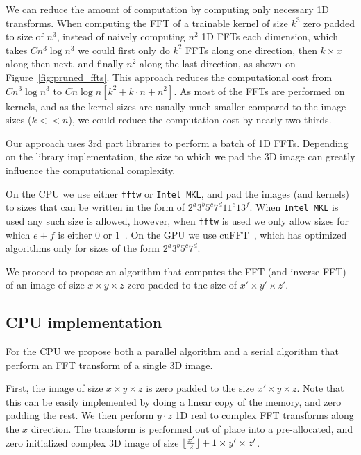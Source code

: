 \documentclass[conference]{IEEEtran}
\DeclarePairedDelimiter{\floor}{\lfloor}{\rfloor}
\begin{document}
  We can reduce the amount of computation by computing only necessary
  1D transforms.  When computing the FFT of a trainable kernel of size
  $k^3$ zero padded to size of $n^3$, instead of naively computing
  $n^2$ 1D FFTs each dimension, which takes $C n^3 \log n^3$ we could
  first only do $k^2$ FFTs along one direction, then $k \times x$
  along then next, and finally $n^2$ along the last direction, as
  shown on Figure~\ref{fig:pruned_ffts}.  This approach reduces the
  computational cost from $C n^3 \log n^3$ to $C n\log n[k^2 + k \cdot
    n + n^2]$.  As most of the FFTs are performed on kernels, and as
  the kernel sizes are usually much smaller compared to the image
  sizes ($k << n$), we could reduce the computation cost by nearly two
  thirds.

  Our approach uses $3$rd part libraries to perform a batch of 1D
  FFTs.  Depending on the library implementation, the size to which we
  pad the 3D image can greatly influence the computational complexity.

  On the CPU we use either {\tt fftw} or {\tt Intel MKL}, and pad the
  images (and kernels) to sizes that can be written in the form of
  $2^a3^b5^c7^d11^e13^f$.  When {\tt Intel MKL} is used any such size
  is allowed, however, when {\tt fftw} is used we only allow sizes for
  which $e+f$ is either $0$ or $1$~\cite{frigo1999fftw,frigo1998fftw}.
  On the GPU we use cuFFT~\cite{nvidia2010cufft}, which has optimized
  algorithms only for sizes of the form $2^a3^b5^c7^d$.

  We proceed to propose an algorithm that computes the FFT (and
  inverse FFT) of an image of size $x \times y \times z$ zero-padded
  to the size of $x' \times y' \times z'$.

\subsection{CPU implementation}

  For the CPU we propose both a parallel algorithm and a serial
  algorithm that perform an FFT transform of a single 3D image.

  First, the image of size $x \times y \times z$ is zero padded to the
  size $x' \times y \times z$.  Note that this can be easily
  implemented by doing a linear copy of the memory, and zero padding
  the rest. We then perform $y \cdot z$ 1D real to complex FFT
  transforms along the $x$ direction.  The transform is performed out
  of place into a pre-allocated, and zero initialized complex 3D image
  of size $\floor{\frac{x'}{2}} + 1 \times y' \times z'$.
\end{document}

